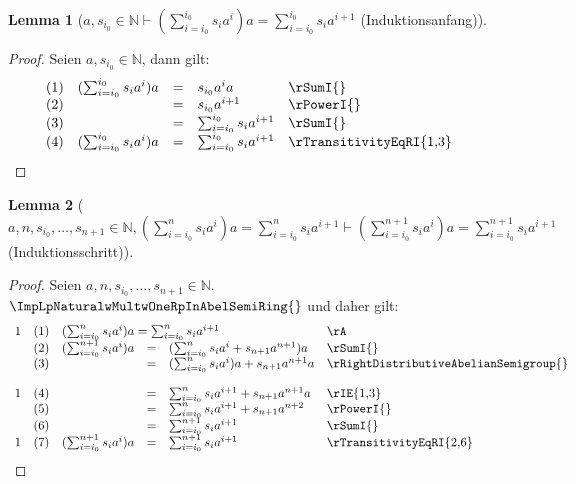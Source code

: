 \documentclass{book}
\theoremstyle{plain}
\newtheorem*{lemma}{Lemma} %
\theoremstyle{remark}
\theoremstyle{definition}
\begin{document}
\label{awsSubLbiSubZeroRbInNaturalImpLpSumSubLbiEqualsiSubZeroRbPowerLbiSubZeroRbsSubiaPoweriRpaEqualsSumSubLbiEqualsiSubZeroRbPowerLbiSubZeroRbsSubiaPowerLbiPlusOneRb}
\begin{lemma}[\(a,s_{i_0}\in\mathbb{N}\vdash (\sum_{i=i_0}^{i_0} s_ia^i)a=\sum_{i=i_0}^{i_0} s_ia^{i+1}\) (Induktionsanfang)]
\end{lemma}
\begin{proof}
    Seien \(a,s_{i_0}\in\mathbb{N}\), dann gilt:
    \[
	\begin{array}{llcll p{5cm}}
              &  (1)  & (\sum_{i=i_0}^{i_0} s_ia^i)a &=& s_{i_0}a^ia & \rSumI{} \\
              &  (2)  &  &=& s_{i_0}a^{i+1} & \rPowerI{} \\
              &  (3)  &  &=& \sum_{i=i_0}^{i_0} s_ia^{i+1} & \rSumI{} \\
              &  (4)  &  (\sum_{i=i_0}^{i_0} s_ia^i)a&=& \sum_{i=i_0}^{i_0} s_ia^{i+1} & \rTransitivityEqRI{1,3} \\
        \end{array}
    \]
\end{proof}

\label{awnwsSubLbiSubZeroRbwDotswsSubLbnPlusOneRbInNaturalwLpSumSubLbiEqualsiSubZeroRbPowerLbnRbsSubiaPoweriRpaEqualsSumSubLbiEqualsiSubZeroRbPowerLbnRbsSubiaPowerLbiPlusOneRbImpLpSumSubLbiEqualsiSubZeroRbPowerLbnPlusOneRbsSubiaPoweriRpaEqualsSumSubLbiEqualsiSubZeroRbPowerLbnPlusOneRbsSubiaPowerLbiPlusOneRb}
\begin{lemma}[\(a,n,s_{i_0},\dots,s_{n+1}\in\mathbb{N},(\sum_{i=i_0}^{n} s_ia^i)a=\sum_{i=i_0}^{n} s_ia^{i+1}\vdash (\sum_{i=i_0}^{n+1} s_ia^i)a=\sum_{i=i_0}^{n+1} s_ia^{i+1}\) (Induktionsschritt)]
\end{lemma}
\begin{proof}
    Seien \(a,n,s_{i_0},\dots,s_{n+1}\in\mathbb{N}\). \(\ImpLpNaturalwMultwOneRpInAbelSemiRing{}\) und daher gilt:
    \[
	\begin{array}{llcll p{5cm}}
            1 &  (1)  & \multicolumn{3}{l}{(\sum_{i=i_0}^{n} s_ia^i)a=\sum_{i=i_0}^{n} s_ia^{i+1}} & \rA \\
              &  (2)  & (\sum_{i=i_0}^{n+1} s_ia^i)a &=& (\sum_{i=i_0}^{n} s_ia^i+s_{n+1}a^{n+1})a & \rSumI{} \\
              &  (3)  &  &=& (\sum_{i=i_0}^{n} s_ia^i)a+s_{n+1}a^{n+1}a & \rRightDistributiveAbelianSemigroup{} \\
            1 &  (4)  &  &=& \sum_{i=i_0}^{n} s_ia^{i+1}+s_{n+1}a^{n+1}a & \rIE{1,3} \\
              &  (5)  &  &=& \sum_{i=i_0}^{n} s_ia^{i+1}+s_{n+1}a^{n+2} & \rPowerI{} \\
              &  (6)  &  &=& \sum_{i=i_0}^{n+1} s_ia^{i+1} & \rSumI{} \\
            1 &  (7)  & (\sum_{i=i_0}^{n+1} s_ia^i)a &=& \sum_{i=i_0}^{n+1} s_ia^{i+1} & \rTransitivityEqRI{2,6} \\
        \end{array}
    \]
\end{proof}
\end{document}
